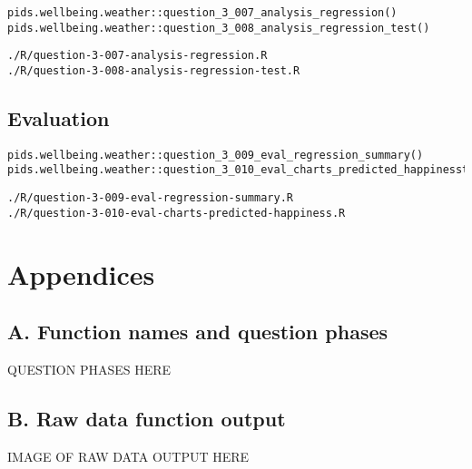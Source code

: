 \documentclass[12pt, oneside, openany]{book}
\begin{document}
\begin{verbatim}
pids.wellbeing.weather::question_3_007_analysis_regression()
pids.wellbeing.weather::question_3_008_analysis_regression_test()
\end{verbatim}

\begin{verbatim}
./R/question-3-007-analysis-regression.R
./R/question-3-008-analysis-regression-test.R
\end{verbatim}

\section*{Evaluation}

\begin{verbatim}
pids.wellbeing.weather::question_3_009_eval_regression_summary()
pids.wellbeing.weather::question_3_010_eval_charts_predicted_happinesst()
\end{verbatim}

\begin{verbatim}
./R/question-3-009-eval-regression-summary.R
./R/question-3-010-eval-charts-predicted-happiness.R
\end{verbatim}

\pagebreak
 


\chapter*{Appendices}

\newpage
\section*{A. Function names and question phases}
\label{appendix:function-names-and-question-phases}

QUESTION PHASES HERE 

\newpage
\section*{B. Raw data function output}
\label{appendix:raw-data-output}

IMAGE OF RAW DATA OUTPUT HERE

\backmatter
\end{document}
